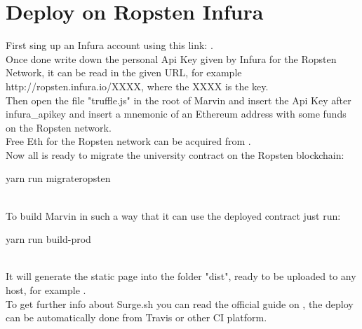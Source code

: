 \documentclass[ManualeSviluppatore.tex]{subfiles}
\begin{document}
\section{Deploy on Ropsten Infura}
First sing up an Infura account using this link: . \\
Once done write down the personal Api Key given by Infura for the Ropsten Network, it can be read in the given URL, for example http://ropsten.infura.io/XXXX, where the XXXX is the key. \\

Then open the file "truffle.js" in the root of Marvin and insert the Api Key after infura\_apikey and insert a mnemonic of an Ethereum address with some funds on the Ropsten network.\\
Free Eth for the Ropsten network can be acquired from .\\

Now all is ready to migrate the university contract on the Ropsten blockchain: \\
\begin{ttfamily} yarn run migrateropsten \end{ttfamily} \\

To build Marvin in such a way that it can use the deployed contract just run:  \\
\begin{ttfamily} yarn run build-prod \end{ttfamily} \\
It will generate the static page into the folder "dist", ready to be uploaded to any host, for example . \\

To get further info about Surge.sh you can read the official guide on , the deploy can be automatically done from Travis or other CI platform.
\end{document}
